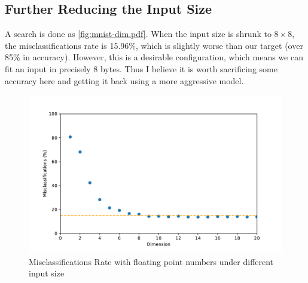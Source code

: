 \subsection{Further Reducing the Input Size}

A search is done as \autoref{fig:mnist-dim.pdf}.
When the input size is shrunk to \(8 \times 8\), the misclassifications rate is 15.96\%, which is slightly worse than our target (over 85\% in accuracy).
However, this is a desirable configuration, which means we can fit an input in precisely 8 bytes.
Thus I believe it is worth sacrificing some accuracy here and getting it back using a more aggressive model.

\begin{figure}[ht!]
    \centering
    \includegraphics[scale=0.64]{images/mnist-dim.pdf}
    \caption{Misclassifications Rate with floating point numbers under different input size}
    \label{fig:mnist-dim.pdf}
\end{figure}
